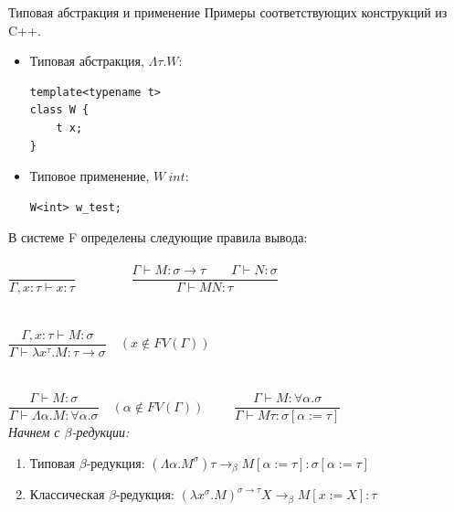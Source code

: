 \documentclass[aspectratio=169]{beamer}
\begin{document}
\begin{frame}[fragile]{Типовая абстракция и применение}
   Примеры соответствующих конструкций из C++.
   \begin{itemize}
    \item Типовая абстракция, $\Lambda \tau.W$:
    \begin{verbatim}
template<typename t>
class W {
    t x;
}
    \end{verbatim}
 	
    \item Типовое применение, $W\ int$:
    \begin{verbatim}
W<int> w_test;
    \end{verbatim}
  \end{itemize}
\end{frame}
 	
\begin{frame}
 	В системе F определены следующие правила вывода: \\ \\
  	\noindent
 	{$\dfrac{}{\Gamma,x:\tau\vdash x:\tau}\qquad\qquad$} 
 	{$\dfrac{\Gamma\vdash M:\sigma\rightarrow\tau\qquad\Gamma\vdash N:\sigma}{\Gamma\vdash M N:\tau}$}\\  \\ \\
 	{$\dfrac{\Gamma,x:\tau\vdash M:\sigma}{\Gamma\vdash\lambda x^{\tau}.M:\tau\rightarrow\sigma}\quad(x\notin FV(\Gamma))$}\\ \\ \\
 	{$\dfrac{\Gamma\vdash M:\sigma}{\Gamma\vdash\Lambda\alpha.M:\forall\alpha.\sigma}\quad(\alpha\notin FV(\Gamma))\qquad$}
 	 $\dfrac{\Gamma\vdash M:\forall\alpha.\sigma}{\Gamma\vdash M\tau:\sigma[\alpha:=\tau]}$
 	\\
 	
    \emph{Начнем с $\beta$-редукции:}
    \begin{enumerate}
        \item Типовая $\beta$-редукция: $(\Lambda\alpha.M^{\sigma})\tau\rightarrow_\beta M[\alpha:= \tau]:\sigma[\alpha:= \tau]$
        \item Классическая $\beta$-редукция: $(\lambda x^{\sigma}.M)^{\sigma\rightarrow\tau}X\rightarrow_\beta M[x:=X]:\tau$ 
    \end{enumerate}
 	
\end{frame}
\end{document}
